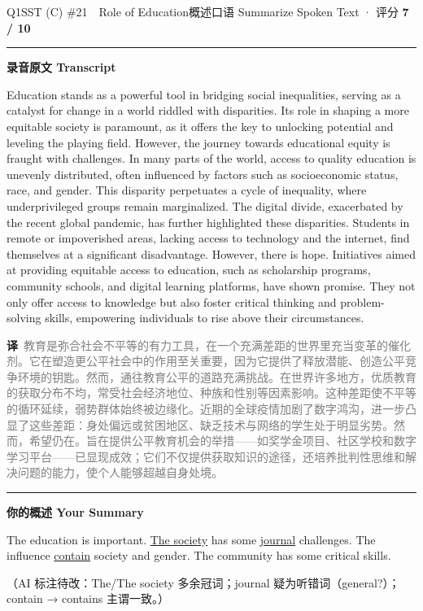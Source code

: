 \documentclass[11pt]{article}
\newcommand{\ptesub}[1]{%
  \par\needspace{2\baselineskip}\smallskip
  {\color{cAccent}\rule[-0.2ex]{3pt}{1.05em}}\hspace{6pt}%
  {\bfseries\color{cHead}#1}\par\nopagebreak\smallskip}
\newcommand{\zh}[1]{{\footnotesize\textcolor{cNote}{\textbf{译}}\ \textcolor{gray}{#1}}}
\begin{document}
\begin{qblock}{Q1\quad SST (C) \#21\ \ Role of Education}{概述口语 Summarize Spoken Text · 评分 \textcolor{cAccent}{\bfseries 7 / 10}}
\ptesub{录音原文 Transcript}
\begin{promptbox}
Education stands as a powerful tool in bridging social inequalities, serving as a catalyst for change in a world riddled with disparities. Its role in shaping a more equitable society is paramount, as it offers the key to unlocking potential and leveling the playing field. However, the journey towards educational equity is fraught with challenges. In many parts of the world, access to quality education is unevenly distributed, often influenced by factors such as socioeconomic status, race, and gender. This disparity perpetuates a cycle of inequality, where underprivileged groups remain marginalized. The digital divide, exacerbated by the recent global pandemic, has further highlighted these disparities. Students in remote or impoverished areas, lacking access to technology and the internet, find themselves at a significant disadvantage. However, there is hope. Initiatives aimed at providing equitable access to education, such as scholarship programs, community schools, and digital learning platforms, have shown promise. They not only offer access to knowledge but also foster critical thinking and problem-solving skills, empowering individuals to rise above their circumstances.
\end{promptbox}
\zh{教育是弥合社会不平等的有力工具，在一个充满差距的世界里充当变革的催化剂。它在塑造更公平社会中的作用至关重要，因为它提供了释放潜能、创造公平竞争环境的钥匙。然而，通往教育公平的道路充满挑战。在世界许多地方，优质教育的获取分布不均，常受社会经济地位、种族和性别等因素影响。这种差距使不平等的循环延续，弱势群体始终被边缘化。近期的全球疫情加剧了数字鸿沟，进一步凸显了这些差距：身处偏远或贫困地区、缺乏技术与网络的学生处于明显劣势。然而，希望仍在。旨在提供公平教育机会的举措——如奖学金项目、社区学校和数字学习平台——已显现成效；它们不仅提供获取知识的途径，还培养批判性思维和解决问题的能力，使个人能够超越自身处境。}
\ptesub{你的概述 Your Summary}
\begin{promptbox}
The education is important. {\color{cAccent}\uline{The society}} has some {\color{cAccent}\uline{journal}} challenges. The influence {\color{cAccent}\uline{contain}} society and gender. The community has some critical skills.
\end{promptbox}
{\footnotesize\color{gray}（AI 标注待改：The/The society 多余冠词；journal 疑为听错词（general?）；contain → contains 主谓一致。）}

\end{qblock}
\end{document}
